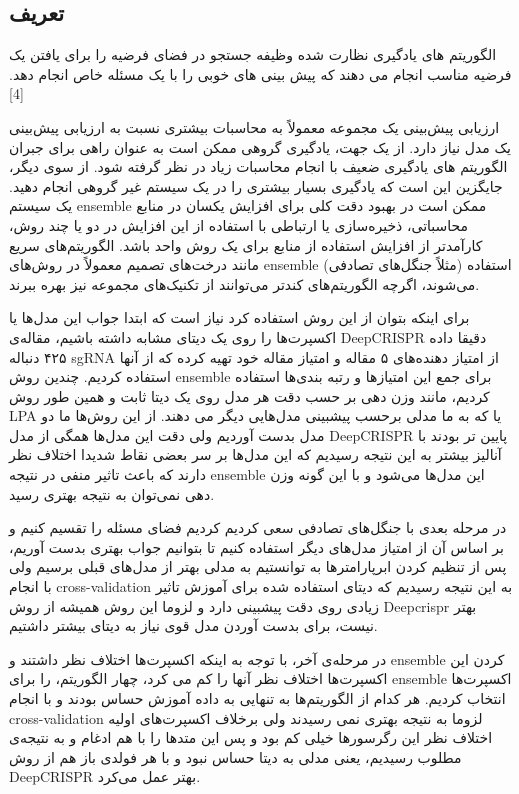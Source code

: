 \documentclass[12pt,a4paper,BCOR=.7cm,headsepline,bibliography=totoc]{report}
\begin{document}
\subsection{تعریف}
الگوریتم های یادگیری نظارت شده وظیفه جستجو در فضای فرضیه را برای یافتن یک فرضیه مناسب انجام می دهند که پیش بینی های خوبی را با یک مسئله خاص انجام دهد.[4]

ارزیابی پیش‌بینی یک مجموعه معمولاً به محاسبات بیشتری نسبت به ارزیابی پیش‌بینی یک مدل نیاز دارد. از یک جهت، یادگیری گروهی ممکن است به عنوان راهی برای جبران الگوریتم های یادگیری ضعیف با انجام محاسبات زیاد در نظر گرفته شود. از سوی دیگر، جایگزین این است که یادگیری بسیار بیشتری را در یک سیستم غیر گروهی انجام دهید. یک سیستم ensemble ممکن است در بهبود دقت کلی برای افزایش یکسان در منابع محاسباتی، ذخیره‌سازی یا ارتباطی با استفاده از این افزایش در دو یا چند روش، کارآمدتر از افزایش استفاده از منابع برای یک روش واحد باشد. الگوریتم‌های سریع مانند درخت‌های تصمیم معمولاً در روش‌های ensemble (مثلاً جنگل‌های تصادفی) استفاده می‌شوند، اگرچه الگوریتم‌های کندتر می‌توانند از تکنیک‌های مجموعه نیز بهره ببرند.

برای اینکه بتوان از این روش‌ استفاده کرد نیاز است که ابتدا جواب این مدل‌ها یا اکسپرت‌ها را روی یک دیتای مشابه داشته باشیم، مقاله‌ی DeepCRISPR دقیقا داده ۴۲۵ دنباله sgRNA از امتیاز دهنده‌های ۵ مقاله و امتیاز مقاله خود تهیه کرده که از آنها استفاده کردیم. چندین روش ensemble برای جمع این امتیاز‌ها و رتبه بندی‌ها استفاده کردیم، مانند وزن دهی بر حسب دقت هر مدل روی یک دیتا ثابت و همین طور روش‌ LPA یا  که به ما مدلی برحسب پیشبینی مدل‌هایی دیگر می دهند. از این روش‌ها ما دو مدل بدست آوردیم ولی دقت این مدل‌ها همگی از مدل DeepCRISPR پایین تر بودند با آنالیز بیشتر به این نتیجه رسیدیم که این مدل‌ها بر سر بعضی نقاط شدیدا اختلاف نظر دارند که باعث تاثیر منفی در نتیجه ensemble این مدل‌ها می‌شود و با این گونه وزن دهی نمی‌توان به نتیجه بهتری رسید.

در مرحله بعدی با جنگل‌های تصادفی سعی کردیم کردیم فضای مسئله را تقسیم کنیم و بر اساس آن از امتیاز مدل‌های دیگر استفاده کنیم تا بتوانیم جواب بهتری بدست آوریم، پس از تنظیم کردن ابرپارامترها به توانستیم به مدلی بهتر از مدل‌های قبلی برسیم ولی با انجام cross-validation به این نتیجه رسیدیم که دیتای استفاده شده برای آموزش تاثیر زیادی روی دقت پیشبینی دارد و لزوما این روش همیشه از روش Deepcrispr بهتر نیست، برای بدست آوردن مدل قوی نیاز به دیتای بیشتر داشتیم.

در مرحله‌ی آخر، با توجه به اینکه اکسپرت‌ها اختلاف نظر داشتند و ensemble کردن این اکسپرت‌ها اختلاف نظر آنها را کم می کرد،‌ چهار الگوریتم، 
را برای ensemble اکسپرت‌ها انتخاب کردیم. هر کدام از الگوریتم‌ها به تنهایی به داده آموزش حساس بودند و با انجام cross-validation لزوما به نتیجه بهتری نمی رسیدند ولی برخلاف اکسپرت‌‌های اولیه اختلاف نظر این رگرسورها خیلی کم بود و پس این متد‌ها را با هم ادغام و به نتیجه‌ی مطلوب رسیدیم، یعنی مدلی به دیتا حساس نبود و با هر فولدی باز‌ هم از روش DeepCRISPR بهتر عمل می‌کرد. 
\end{document}
